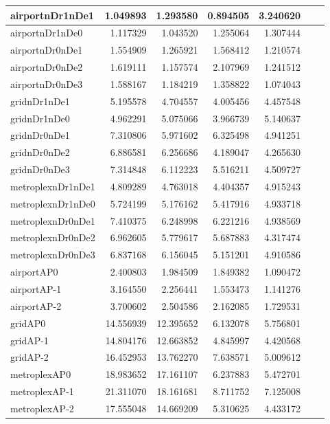 \begin{longtable}{|l|r|r|r|r|r|r|}
\endlastfoot
airportnDr1nDe1 & 1.049893 & 1.293580 & 0.894505 & 3.240620 \\ \hline
airportnDr1nDe0 & 1.117329 & 1.043520 & 1.255064 & 1.307444 \\ \hline
airportnDr0nDe1 & 1.554909 & 1.265921 & 1.568412 & 1.210574 \\ \hline
airportnDr0nDe2 & 1.619111 & 1.157574 & 2.107969 & 1.241512 \\ \hline
airportnDr0nDe3 & 1.588167 & 1.184219 & 1.358822 & 1.074043 \\ \hline
gridnDr1nDe1 & 5.195578 & 4.704557 & 4.005456 & 4.457548 \\ \hline
gridnDr1nDe0 & 4.962291 & 5.075066 & 3.966739 & 5.140637 \\ \hline
gridnDr0nDe1 & 7.310806 & 5.971602 & 6.325498 & 4.941251 \\ \hline
gridnDr0nDe2 & 6.886581 & 6.256686 & 4.189047 & 4.265630 \\ \hline
gridnDr0nDe3 & 7.314848 & 6.112223 & 5.516211 & 4.509727 \\ \hline
metroplexnDr1nDe1 & 4.809289 & 4.763018 & 4.404357 & 4.915243 \\ \hline
metroplexnDr1nDe0 & 5.724199 & 5.176162 & 5.417916 & 4.933718 \\ \hline
metroplexnDr0nDe1 & 7.410375 & 6.248998 & 6.221216 & 4.938569 \\ \hline
metroplexnDr0nDe2 & 6.962605 & 5.779617 & 5.687883 & 4.317474 \\ \hline
metroplexnDr0nDe3 & 6.837168 & 6.156045 & 5.151201 & 4.910586 \\ \hline
airportAP0 & 2.400803 & 1.984509 & 1.849382 & 1.090472 \\ \hline
airportAP-1 & 3.164550 & 2.256441 & 1.553473 & 1.141276 \\ \hline
airportAP-2 & 3.700602 & 2.504586 & 2.162085 & 1.729531 \\ \hline
gridAP0 & 14.556939 & 12.395652 & 6.132078 & 5.756801 \\ \hline
gridAP-1 & 14.804176 & 12.663852 & 4.845997 & 4.420568 \\ \hline
gridAP-2 & 16.452953 & 13.762270 & 7.638571 & 5.009612 \\ \hline
metroplexAP0 & 18.983652 & 17.161107 & 6.237883 & 5.472701 \\ \hline
metroplexAP-1 & 21.311070 & 18.161681 & 8.711752 & 7.125008 \\ \hline
metroplexAP-2 & 17.555048 & 14.669209 & 5.310625 & 4.433172 \\ \hline

\end{longtable}
